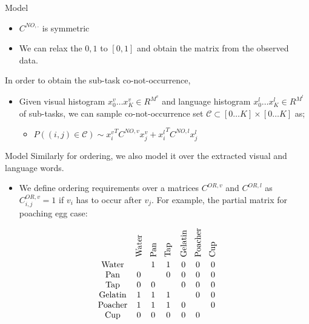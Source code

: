 \begin{frame}{Model}
\begin{itemize}
\item $C^{NO,.}$ is symmetric
\item We can relax the ${0,1}$ to $[0,1]$ and obtain the matrix from the observed data.
\end{itemize}
In order to obtain the sub-task co-not-occurrence,
\begin{itemize}
\item Given visual histogram $x^v_0 \ldots x^v_K \in R^{M^v}$ and language histogram $x^l_0 \ldots x^l_K \in R^{M^l}$ of sub-tasks, we can sample co-not-occurrence set $\mathcal{C} \subset [0\ldots K]
 \times [0 \ldots K]$ as;
\begin{itemize}
\item $P((i,j) \in \mathcal{C}) \sim {x^v_i}^T C^{NO,v} x^v_j + {x^l_i}^T C^{NO,l} x^l_j$
\end{itemize} 
\end{itemize}
\end{frame}


\begin{frame}{Model}
Similarly for ordering, we also model it over the extracted visual and language words.
\begin{itemize}
\item We define ordering requirements over a matrices $C^{OR,v}$ and $C^{OR,l}$ as $C^{OR,v}_{i,j} =1$ if $v_i$ has to occur after $v_j$. For example, the partial matrix for poaching egg case:
\end{itemize}
\[
 \begin{array}{ccccccc} 
&\rotatebox{90}{Water} & \rotatebox{90}{Pan} & \rotatebox{90}{Tap} & \rotatebox{90}{Gelatin} & \rotatebox{90}{Poacher} & \rotatebox{90}{Cup} \\ 
\text{Water} &  & 1 & 1 & 0 & 0 & 0 \\
\text{Pan} & 0 &  & 0 & 0 & 0 & 0 \\
\text{Tap} & 0 & 0 &  & 0 & 0 & 0 \\
\text{Gelatin} & 1 & 1 & 1 &  & 0 & 0 \\
\text{Poacher} & 1 & 1 & 1 & 0 &  & 0 \\
\text{Cup} & 0 & 0 & 0 & 0 & 0 & 
\end{array} 
\]
\end{frame}

